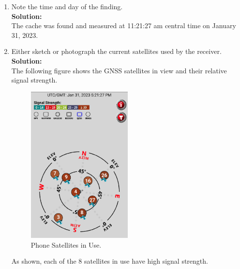 \documentclass[11pt]{article}
\newcommand{\solution}{\textbf{\\Solution: \\}}
\begin{document}
\begin{enumerate}[label=\textbf{\arabic*.}]
  \item  Note the time and day of the finding. 
  \solution
  The cache was found and measured at 11:21:27 am central time 
  on January 31, 2023.

  \item Either sketch or photograph the current satellites used by the 
  receiver.
  \solution
  The following figure shows the GNSS satellites in view and their relative 
  signal strength.
  \begin{figure}[H]
    \centering
    \includegraphics[width=0.5\textwidth]{p4.png}
    \caption{Phone Satellites in Use.}
  \end{figure}
  As shown, each of the 8 satellites in use have high signal strength.


\end{enumerate}
\end{document}
